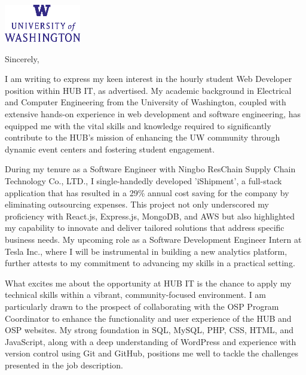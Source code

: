 \documentclass[11pt,letterpaper,roman]{moderncv}
\begin{document}
\begin{minipage}[t]{\textwidth}
  \includegraphics[width=0.25\textwidth]{logo.eps}
\end{minipage}


\opening{\vspace*{-2em}}
\closing{Sincerely,}{\vspace*{-2em}}
\makelettertitle
\justifying


I am writing to express my keen interest in the hourly student Web Developer position within HUB IT, as advertised. My academic background in Electrical and Computer Engineering from the University of Washington, coupled with extensive hands-on experience in web development and software engineering, has equipped me with the vital skills and knowledge required to significantly contribute to the HUB's mission of enhancing the UW community through dynamic event centers and fostering student engagement.

During my tenure as a Software Engineer with Ningbo ResChain Supply Chain Technology Co., LTD., I single-handedly developed 'iShipment', a full-stack application that has resulted in a 29\% annual cost saving for the company by eliminating outsourcing expenses. This project not only underscored my proficiency with React.js, Express.js, MongoDB, and AWS but also highlighted my capability to innovate and deliver tailored solutions that address specific business needs. My upcoming role as a Software Development Engineer Intern at Tesla Inc., where I will be instrumental in building a new analytics platform, further attests to my commitment to advancing my skills in a practical setting.

What excites me about the opportunity at HUB IT is the chance to apply my technical skills within a vibrant, community-focused environment. I am particularly drawn to the prospect of collaborating with the OSP Program Coordinator to enhance the functionality and user experience of the HUB and OSP websites. My strong foundation in SQL, MySQL, PHP, CSS, HTML, and JavaScript, along with a deep understanding of WordPress and experience with version control using Git and GitHub, positions me well to tackle the challenges presented in the job description.
\end{document}
